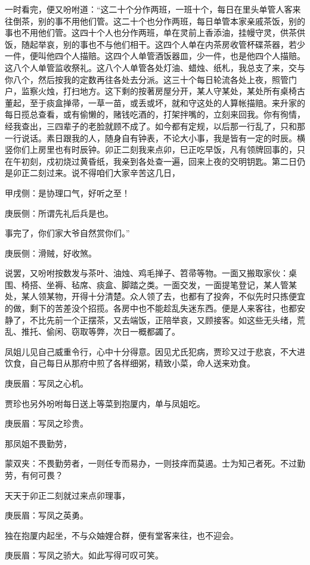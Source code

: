 \begin{parag}
    一时看完，便又吩咐道：“这二十个分作两班，一班十个，每日在里头单管人客来往倒茶，别的事不用他们管。这二十个也分作两班，每日单管本家亲戚茶饭，别的事也不用他们管。这四十个人也分作两班，单在灵前上香添油，挂幔守灵，供茶供饭，随起举哀，别的事也不与他们相干。这四个人单在内茶房收管杯碟茶器，若少一件，便叫他四个人描赔。这四个人单管酒饭器皿，少一件，也是他四个人描赔。这八个人单管监收祭礼。这八个人单管各处灯油、蜡烛、纸札，我总支了来，交与你八个，然后按我的定数再往各处去分派。这三十个每日轮流各处上夜，照管门户，监察火烛，打扫地方。这下剩的按著房屋分开，某人守某处，某处所有桌椅古董起，至于痰盒掸帚，一草一苗，或丢或坏，就和守这处的人算帐描赔。来升家的每日揽总查看，或有偷懒的，赌钱吃酒的，打架拌嘴的，立刻来回我。你有徇情，经我查出，三四辈子的老脸就顾不成了。如今都有定规，以后那一行乱了，只和那一行说话。素日跟我的人，随身自有钟表，不论大小事，我是皆有一定的时辰。横竖你们上房里也有时辰钟。卯正二刻我来点卯，巳正吃早饭，凡有领牌回事的，只在午初刻，戍初烧过黄昏纸，我亲到各处查一遍，回来上夜的交明钥匙。第二日仍是卯正二刻过来。说不得咱们大家辛苦这几日，\begin{note}甲戌侧：是协理口气，好听之至！\end{note}\begin{note}庚辰侧：所谓先礼后兵是也。\end{note}事完了，你们家大爷自然赏你们。”\begin{note}庚辰侧：滑贼，好收煞。\end{note}
\end{parag}


\begin{parag}
    说罢，又吩咐按数发与茶叶、油烛、鸡毛掸子、笤帚等物。一面又搬取家伙：桌围、椅搭、坐褥、毡席、痰盒、脚踏之类。一面交发，一面提笔登记，某人管某处，某人领某物，开得十分清楚。众人领了去，也都有了投奔，不似先时只拣便宜的做，剩下的苦差没个招揽。各房中也不能趁乱失迷东西。便是人来客往，也都安静了，不比先前一个正摆茶，又去端饭，正陪举哀，又顾接客。如这些无头绪，荒乱、推托、偷闲、窃取等弊，次日一概都蠲了。
\end{parag}


\begin{parag}
    凤姐儿见自己威重令行，心中十分得意。因见尤氏犯病，贾珍又过于悲哀，不大进饮食，自己每日从那府中煎了各样细粥，精致小菜，命人送来劝食。\begin{note}庚辰眉：写凤之心机。\end{note}贾珍也另外吩咐每日送上等菜到抱厦内，单与凤姐吃。\begin{note}庚辰眉：写凤之珍贵。\end{note}那凤姐不畏勤劳，\begin{note}蒙双夹：不畏勤劳者，一则任专而易办，一则技痒而莫遏。士为知己者死。不过勤劳，有何可畏？\end{note}天天于卯正二刻就过来点卯理事，\begin{note}庚辰眉：写凤之英勇。\end{note}独在抱厦内起坐，不与众妯娌合群，便有堂客来往，也不迎会。\begin{note}庚辰眉：写凤之骄大。如此写得可叹可笑。\end{note}
\end{parag}


